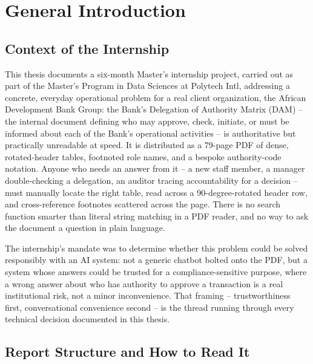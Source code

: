 \chapter*{General Introduction}

\section*{Context of the Internship}

This thesis documents a six-month Master's internship project, carried out as part of the Master's Program in Data Sciences at Polytech Intl, addressing a concrete, everyday operational problem for a real client organization, the African Development Bank Group: the Bank's Delegation of Authority Matrix (DAM) -- the internal document defining who may approve, check, initiate, or must be informed about each of the Bank's operational activities -- is authoritative but practically unreadable at speed. It is distributed as a 79-page PDF of dense, rotated-header tables, footnoted role names, and a bespoke authority-code notation. Anyone who needs an answer from it -- a new staff member, a manager double-checking a delegation, an auditor tracing accountability for a decision -- must manually locate the right table, read across a 90-degree-rotated header row, and cross-reference footnotes scattered across the page. There is no search function smarter than literal string matching in a PDF reader, and no way to ask the document a question in plain language.

The internship's mandate was to determine whether this problem could be solved responsibly with an AI system: not a generic chatbot bolted onto the PDF, but a system whose answers could be trusted for a compliance-sensitive purpose, where a wrong answer about who has authority to approve a transaction is a real institutional risk, not a minor inconvenience. That framing -- trustworthiness first, conversational convenience second -- is the thread running through every technical decision documented in this thesis.

\section*{Report Structure and How to Read It}

